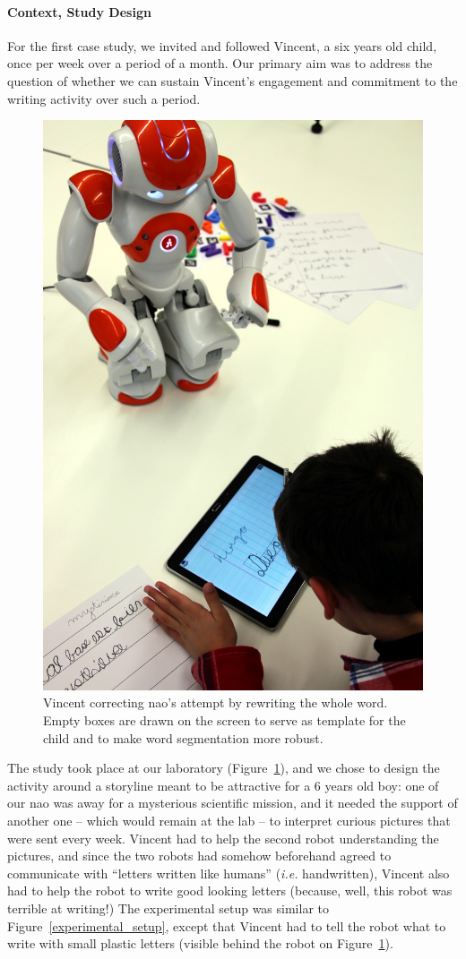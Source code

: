 \documentclass{article}
\newcommand{\ie}{\textit{i.e.}\xspace}
\begin{document}
\paragraph{Context, Study Design}

For the first case study, we invited and followed Vincent, a six years old
child, once per week over a period of a month. Our primary aim was to address the
question of whether we can sustain Vincent's engagement and commitment to the
writing activity over such a period.

\begin{figure}
    \centering
    \includegraphics[width=0.5\linewidth]{diego}
    \caption{\small Vincent correcting {\sc nao}'s attempt by rewriting the
        whole word. Empty boxes are drawn on the screen to serve as template for the child
        and to make word segmentation more robust.}
    \label{fig:diego}
\end{figure}

The study took place at our laboratory (Figure~\ref{fig:diego}), and we chose to
design the activity around a storyline meant to be attractive for a 6 years old
boy: one of our {\sc nao} was away for a mysterious scientific mission, and it
needed the support of another one -- which would remain at the lab -- to interpret
curious pictures that were sent every week. Vincent had to help the second robot
understanding the pictures, and since the two robots had somehow beforehand
agreed to communicate with ``letters written like humans'' (\ie handwritten),
Vincent also had to help the robot to write good looking letters (because, well,
this robot was terrible at writing!) The experimental setup was similar to
Figure~\ref{experimental_setup}, except that Vincent had to tell the robot what
to write with small plastic letters (visible behind the robot on Figure~\ref{fig:diego}).
\end{document}
